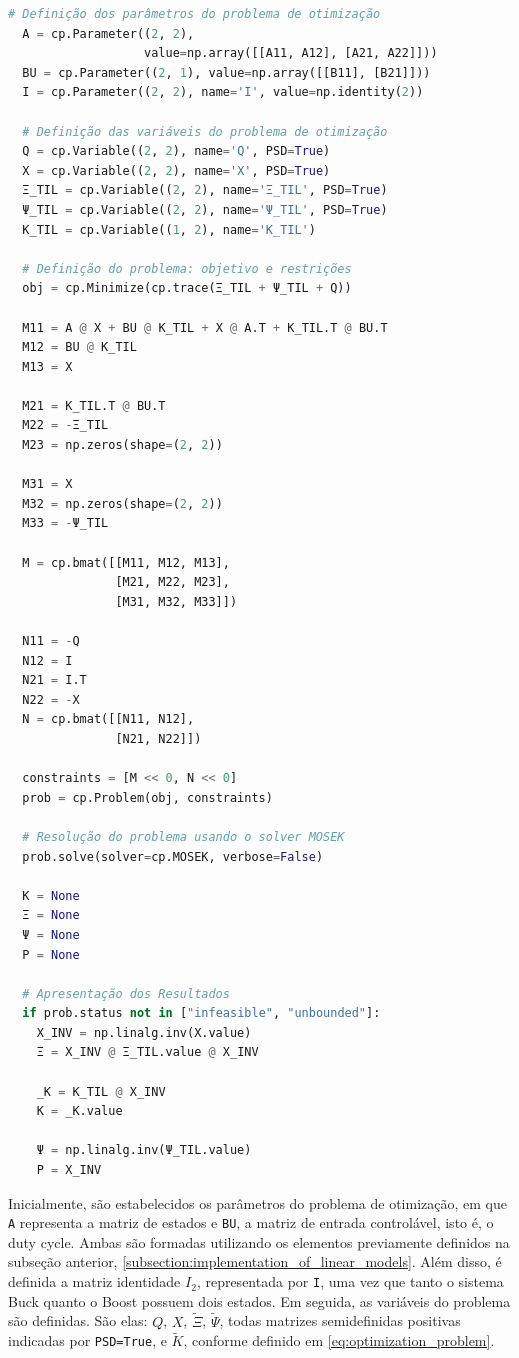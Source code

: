 \vspace{8pt}
\begin{lstlisting}[language=Python, caption={Resolução do problema de otimização definida em \eqref{eq:optimization_problem}.}, label=cod:params_etm]
  # Definição dos parâmetros do problema de otimização
  A = cp.Parameter((2, 2),
                   value=np.array([[A11, A12], [A21, A22]]))
  BU = cp.Parameter((2, 1), value=np.array([[B11], [B21]]))
  I = cp.Parameter((2, 2), name='I', value=np.identity(2))
  
  # Definição das variáveis do problema de otimização
  Q = cp.Variable((2, 2), name='Q', PSD=True)
  X = cp.Variable((2, 2), name='X', PSD=True)
  Ξ_TIL = cp.Variable((2, 2), name='Ξ_TIL', PSD=True)
  Ψ_TIL = cp.Variable((2, 2), name='Ψ_TIL', PSD=True)
  K_TIL = cp.Variable((1, 2), name='K_TIL')
  
  # Definição do problema: objetivo e restrições
  obj = cp.Minimize(cp.trace(Ξ_TIL + Ψ_TIL + Q))
  
  M11 = A @ X + BU @ K_TIL + X @ A.T + K_TIL.T @ BU.T
  M12 = BU @ K_TIL
  M13 = X
  
  M21 = K_TIL.T @ BU.T
  M22 = -Ξ_TIL
  M23 = np.zeros(shape=(2, 2))
  
  M31 = X
  M32 = np.zeros(shape=(2, 2))
  M33 = -Ψ_TIL
  
  M = cp.bmat([[M11, M12, M13],
               [M21, M22, M23],
               [M31, M32, M33]])
  
  N11 = -Q
  N12 = I
  N21 = I.T
  N22 = -X
  N = cp.bmat([[N11, N12],
               [N21, N22]])
  
  constraints = [M << 0, N << 0]
  prob = cp.Problem(obj, constraints)
  
  # Resolução do problema usando o solver MOSEK
  prob.solve(solver=cp.MOSEK, verbose=False)
  
  K = None
  Ξ = None
  Ψ = None
  P = None
  
  # Apresentação dos Resultados
  if prob.status not in ["infeasible", "unbounded"]:
    X_INV = np.linalg.inv(X.value)
    Ξ = X_INV @ Ξ_TIL.value @ X_INV
  
    _K = K_TIL @ X_INV
    K = _K.value
  
    Ψ = np.linalg.inv(Ψ_TIL.value)
    P = X_INV
\end{lstlisting}

Inicialmente, são estabelecidos os parâmetros do problema de otimização, em que \texttt{A} representa a matriz de estados e \texttt{BU}, a matriz de entrada controlável, isto é, o duty cycle. Ambas são formadas utilizando os elementos previamente definidos na subseção anterior, \ref{subsection:implementation_of_linear_models}. Além disso, é definida a matriz identidade $I_2$, representada por \texttt{I}, uma vez que tanto o sistema Buck quanto o Boost possuem dois estados. Em seguida, as variáveis do problema são definidas. São elas: $Q$, $X$, $\tilde{\Xi}$, $\tilde{\Psi}$, todas matrizes semidefinidas positivas indicadas por \texttt{PSD=True}, e $\tilde{K}$, conforme definido em \eqref{eq:optimization_problem}.

